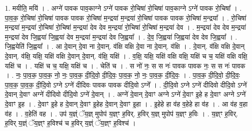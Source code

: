 \documentclass[17pt]{extarticle}
\begin{document}
1. मयीति॒ मयि॑ । . अग्ने॑ पावक पाव॒काग्ने ऽग्ने॑ पावक रो॒चिषा॑ रो॒चिषा॑ पाव॒काग्ने ऽग्ने॑ पावक रो॒चिषा᳚ । . पा॒व॒क॒ रो॒चिषा॑ रो॒चिषा॑ पावक पावक रो॒चिषा॑ म॒न्द्रया॑ म॒न्द्रया॑ रो॒चिषा॑ पावक पावक रो॒चिषा॑ म॒न्द्रया᳚ । . रो॒चिषा॑ म॒न्द्रया॑ म॒न्द्रया॑ रो॒चिषा॑ रो॒चिषा॑ म॒न्द्रया॑ देव देव म॒न्द्रया॑ रो॒चिषा॑ रो॒चिषा॑ म॒न्द्रया॑ देव । . म॒न्द्रया॑ देव देव म॒न्द्रया॑ म॒न्द्रया॑ देव जि॒ह्वया॑ जि॒ह्वया॑ देव म॒न्द्रया॑ म॒न्द्रया॑ देव जि॒ह्वया᳚ । . दे॒व॒ जि॒ह्वया॑ जि॒ह्वया॑ देव देव जि॒ह्वया᳚ । . जि॒ह्वयेति॑ जि॒ह्वया᳚ । . आ दे॒वान् दे॒वा ना दे॒वान्. व॑क्षि वक्षि दे॒वा ना दे॒वान्. व॑क्षि । . दे॒वान्. व॑क्षि वक्षि दे॒वान् दे॒वान्. व॑क्षि॒ यक्षि॒ यक्षि॑ वक्षि दे॒वान् दे॒वान्. व॑क्षि॒ यक्षि॑ । . व॒क्षि॒ यक्षि॒ यक्षि॑ वक्षि वक्षि॒ यक्षि॑ च च॒ यक्षि॑ वक्षि वक्षि॒ यक्षि॑ च । . यक्षि॑ च च॒ यक्षि॒ यक्षि॑ च । . चेति॑ च । . स नो॑ नः॒ स स नः॑ पावक पावक नः॒ स स नः॑ पावक । . नः॒ पा॒व॒क॒ पा॒व॒क॒ नो॒ नः॒ पा॒व॒क॒ दी॒दि॒वो॒ दी॒दि॒वः॒ पा॒व॒क॒ नो॒ नः॒ पा॒व॒क॒ दी॒दि॒वः॒ । . पा॒व॒क॒ दी॒दि॒वो॒ दी॒दि॒वः॒ पा॒व॒क॒ पा॒व॒क॒ दी॒दि॒वो ऽग्ने ऽग्ने॑ दीदिवः पावक पावक दीदि॒वो ऽग्ने᳚ । . दी॒दि॒वो ऽग्ने ऽग्ने॑ दीदिवो दीदि॒वो ऽग्ने॑ दे॒वान् दे॒वाꣳ अग्ने॑ दीदिवो दीदि॒वो ऽग्ने॑ दे॒वान् । . अग्ने॑ दे॒वान् दे॒वाꣳ अग्ने ऽग्ने॑ दे॒वाꣳ इ॒हे ह दे॒वाꣳ अग्ने ऽग्ने॑ दे॒वाꣳ इ॒ह । . दे॒वाꣳ इ॒हे ह दे॒वान् दे॒वाꣳ इ॒हेह दे॒वान् दे॒वाꣳ इ॒हा । . इ॒हेहे हा व॑ह व॒हेहे हा व॑ह । . आ व॑ह व॒हा व॑ह । . व॒हेति॑ वह । . उप॑ य॒ज्ञ्ं ॅय॒ज्ञ् मुपोप॑ य॒ज्ञ्ꣳ ह॒विर्. ह॒विर् य॒ज्ञ् मुपोप॑ य॒ज्ञ्ꣳ ह॒विः । . य॒ज्ञ्ꣳ ह॒विर्. ह॒विर् य॒ज्ञ्ं ॅय॒ज्ञ्ꣳ ह॒विश्च॑ च ह॒विर् य॒ज्ञ्ं ॅय॒ज्ञ्ꣳ ह॒विश्च॑ । \newline
\end{document}
